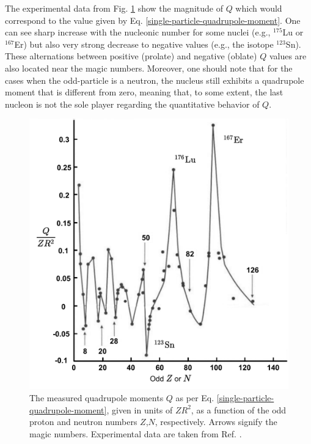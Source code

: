 The experimental data from Fig. \ref{experimental-Q-odd-nuclei} show the magnitude of $Q$ which would correspond to the value given by Eq. \ref{single-particle-quadrupole-moment}. One can see sharp increase with the nucleonic number for some nuclei (e.g., $^{175}$Lu or $^{167}$Er) but also very strong decrease to negative values (e.g., the isotope $^{123}$Sn). These alternations between positive (prolate) and negative (oblate) $Q$ values are also located near the magic numbers. Moreover, one should note that for the cases when the odd-particle is a neutron, the nucleus still exhibits a quadrupole moment that is different from zero, meaning that, to some extent, the last nucleon is not the sole player regarding the quantitative behavior of $Q$.
\begin{figure}
    \centering
    \includegraphics[scale=0.65]{Chapters/Figures/Exp_quadrupoleMoments.pdf}
    \caption{The measured quadrupole moments $Q$ as per Eq. \ref{single-particle-quadrupole-moment}, given in units of $ZR^2$, as a function of the odd proton and neutron numbers $Z$,$N$, respectively. Arrows signify the magic numbers. Experimental data are taken from Ref. \cite{bertulani2007nuclear}.}
    \label{experimental-Q-odd-nuclei}
\end{figure}

